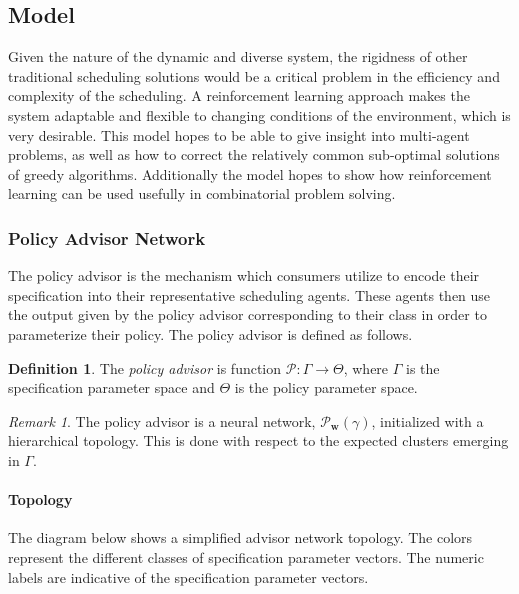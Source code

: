 \documentclass{article}
\theoremstyle{definition}
\newtheorem{definition}{Definition}[section]
\theoremstyle{remark}
\newtheorem*{remark}{Remark}
\begin{document}
		\subsection{Model}

		Given the nature of the dynamic and diverse system, the rigidness of other traditional scheduling solutions would be a critical problem in the efficiency and complexity of the scheduling. A reinforcement learning approach makes the system adaptable and flexible to changing conditions of the environment, which is very desirable. This model hopes to be able to give insight into multi-agent problems, as well as how to correct the relatively common sub-optimal solutions of greedy algorithms. Additionally the model hopes to show how reinforcement learning can be used usefully in combinatorial problem solving.

			\subsubsection{Policy Advisor Network}

			The policy advisor is the mechanism which consumers utilize to encode their specification into their representative scheduling agents. These agents then use the output given by the policy advisor corresponding to their class in order to parameterize their policy. The policy advisor is defined as follows.

			\begin{definition}
				The \emph{policy advisor} is function $\mathcal{P}: \Gamma \rightarrow \Theta$, where $\Gamma$ is the specification parameter space and $\Theta$ is the policy parameter space.
			\end{definition}

			\begin{remark}
				The policy advisor is a neural network, $\mathcal{P}_{\mathbf{w}}(\gamma)$, initialized with a hierarchical topology. This is done with respect to the expected clusters emerging in $\Gamma$.
			\end{remark}


				\paragraph{Topology}

				The diagram below shows a simplified advisor network topology. The colors represent the different classes of specification parameter vectors. The numeric labels are indicative of the specification parameter vectors.
\end{document}
